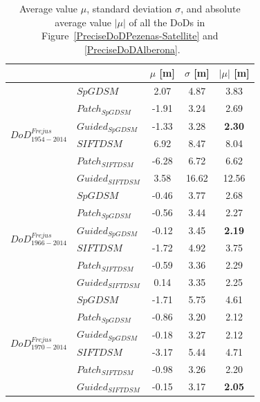 \begin{table}%
	\footnotesize
	\centering
	\begin{tabular}{||l|l|c|c|c||}\hline
		& &$\mu$ [m]&$\sigma$ [m]&$|\mu|$ [m]\\\hline\hline
\multirow{6}{*}{$DoD^{Frejus}_{1954-2014}$}
&${{SpGDSM}}$ & 2.07 & 4.87 & {3.83} \\
&${Patch_{SpGDSM}}$ & -1.91 & 3.24 & 2.69\\
&${Guided_{SpGDSM}}$ & -1.33 & 3.28 & \textbf{2.30}\\
&${{SIFTDSM}}$ & 6.92 & 8.47 & 8.04\\
&${Patch_{SIFTDSM}}$ & -6.28 & 6.72 & 6.62\\
&${Guided_{SIFTDSM}}$ & 3.58 & 16.62 & 12.56\\\hline

\multirow{6}{*}{$DoD^{Frejus}_{1966-2014}$}
&${{SpGDSM}}$ & -0.46 & 3.77 & {2.68}\\
&${Patch_{SpGDSM}}$ & -0.56 & 3.44 & 2.27\\
&${Guided_{SpGDSM}}$ & -0.12 & 3.45 & \textbf{2.19}\\
&${{SIFTDSM}}$ & -1.72 & 4.92 & 3.75\\
&${Patch_{SIFTDSM}}$ & -0.59 & 3.36 & 2.29\\
&${Guided_{SIFTDSM}}$ & 0.14 & 3.35 & 2.25\\\hline

\multirow{6}{*}{$DoD^{Frejus}_{1970-2014}$}
&${{SpGDSM}}$ & -1.71 & 5.75 & 4.61\\
&${Patch_{SpGDSM}}$ & -0.86 & 3.20 & 2.12\\
&${Guided_{SpGDSM}}$ & -0.18 & 3.27 & 2.12\\
&${{SIFTDSM}}$ & -3.17 & 5.44 & 4.71\\
&${Patch_{SIFTDSM}}$ & -0.98 & 3.26 & 2.20\\
&${Guided_{SIFTDSM}}$ & -0.15 & 3.17 & \textbf{2.05}\\\hline		

	\end{tabular}
	\caption{Average value $\mu$, standard deviation $\sigma$, and absolute average value $|\mu|$ of all the \ac{DoD}s in Figure~\ref{PreciseDoDPezenas-Satellite} and ~\ref{PreciseDoDAlberona}.}
	\label{PreciseDoDStatistic}
\end{table}


